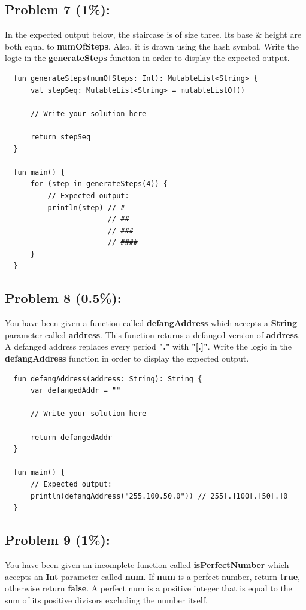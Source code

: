\documentclass{article}
\begin{document}
\subsection*{Problem 7 (1\%):}
In the expected output below, the staircase is of size three. Its base \& height are both equal to \textbf{numOfSteps}. Also, it is drawn using the hash symbol. Write the logic in the \textbf{generateSteps} function in order to display the expected output.

\begin{verbatim}
  fun generateSteps(numOfSteps: Int): MutableList<String> {
      val stepSeq: MutableList<String> = mutableListOf()
      
      // Write your solution here
      
      return stepSeq  
  }

  fun main() {
      for (step in generateSteps(4)) {
          // Expected output:
          println(step) // #  
                        // ## 
                        // ###
                        // ####
      }
  }
\end{verbatim}

\subsection*{Problem 8 (0.5\%):}
You have been given a function called \textbf{defangAddress} which accepts a \textbf{String} parameter called \textbf{address}. This function returns a defanged version of \textbf{address}. A defanged address replaces every period \textbf{"."} with \textbf{"[.]"}. Write the logic in the \textbf{defangAddress} function in order to display the expected output.

\begin{verbatim}
  fun defangAddress(address: String): String {
      var defangedAddr = ""
      
      // Write your solution here
      
      return defangedAddr
  }

  fun main() {
      // Expected output:
      println(defangAddress("255.100.50.0")) // 255[.]100[.]50[.]0
  }
\end{verbatim}

\subsection*{Problem 9 (1\%):}
You have been given an incomplete function called \textbf{isPerfectNumber} which accepts an \textbf{Int} parameter called \textbf{num}. If \textbf{num} is a perfect number, return \textbf{true}, otherwise return \textbf{false}. A perfect num is a positive integer that is equal to the sum of its positive divisors excluding the number itself.
\end{document}
